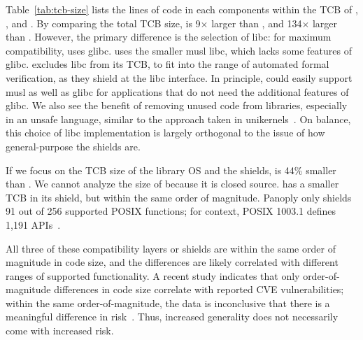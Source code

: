 Table~\ref{tab:tcb-size} lists the lines of code in each components within the TCB of \graphenesgx{}, \scone{}, and \panoply{}.
By comparing the total TCB size, \graphenesgx{} is 9$\times{}$ larger than \scone{}, and 134$\times{}$ larger than \panoply{}.
However, the primary difference is the selection of libc: 
for maximum compatibility, \graphene{} uses glibc.
\scone{} uses the smaller musl libc, which lacks some features of glibc.
\panoply{} excludes libc from its TCB,
to fit into the range of automated formal verification,
as they shield at the libc interface.
In principle, \graphene{} could easily support musl as well as glibc for applications
that do not need the additional features of glibc.
We also see the benefit of removing unused code from 
libraries, especially in an unsafe language,
similar to the approach taken in unikernels~\cite{unikernels}.
On balance, 
this choice of libc implementation is largely orthogonal to the issue
of how general-purpose the shields are.


If we focus on the TCB size of the library OS and the shields, 
\graphenesgx{} is 
44\% smaller than \scone{}. 
We cannot analyze the size of \scone{} because it is closed source.
\panoply{} has a smaller TCB in its shield, but within the same order of magnitude.
Panoply only shields 91 out of 256 supported POSIX functions; for context, POSIX 1003.1 defines 1,191 APIs~\cite{POSIX1003-1-2008}.

All three of these compatibility layers or shields are within the same
order of magnitude in code size, and the differences are likely 
correlated with different ranges of supported functionality.
A recent study indicates that only order-of-magnitude differences in code
size correlate with reported CVE vulnerabilities; within the same order-of-magnitude,
the data is inconclusive that there is a meaningful difference in risk~\cite{security-metric}.
Thus, increased generality does not necessarily come with 
increased risk. %

